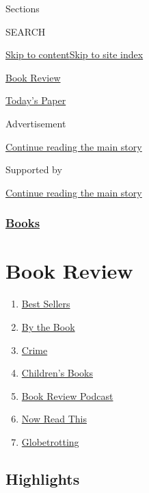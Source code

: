 Sections

SEARCH

\protect\hyperlink{site-content}{Skip to
content}\protect\hyperlink{site-index}{Skip to site index}

\href{https://www.nytimes.com/section/books/review}{Book Review}

\href{https://myaccount.nytimes.com/auth/login?response_type=cookie\&client_id=vi}{}

\href{https://www.nytimes.com/section/todayspaper}{Today's Paper}

Advertisement

\protect\hyperlink{after-top}{Continue reading the main story}

Supported by

\protect\hyperlink{after-sponsor}{Continue reading the main story}

\hypertarget{books}{%
\subsubsection{\texorpdfstring{\href{/section/books}{Books}}{Books}}\label{books}}

\hypertarget{book-review}{%
\section{Book Review}\label{book-review}}

\begin{enumerate}
\def\labelenumi{\arabic{enumi}.}
\tightlist
\item
  \href{/books/best-sellers/}{Best Sellers}
\item
  \href{/column/by-the-book}{By the Book}
\item
  \href{/column/crime}{Crime}
\item
  \href{/column/childrens-books}{Children's Books}
\item
  \href{/column/book-review-podcast}{Book Review Podcast}
\item
  \href{/spotlight/now-read-this}{Now Read This}
\item
  \href{/interactive/2020/01/08/books/new-books-international.html}{Globetrotting}
\end{enumerate}

\hypertarget{highlights}{%
\subsection{Highlights}\label{highlights}}

